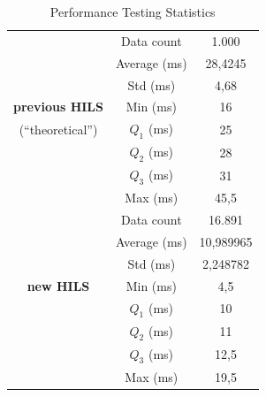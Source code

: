 \begin{table}[!htbp]
	\caption{Performance Testing Statistics}
	\label{tbl-section-5-perf-result-statistics}
	\begin{center}
		\begin{tabular}{c c c}
			\toprule
			                       & Data count   & 1.000     \\
			\cline{2-3}
			                       & Average (ms) & 28,4245   \\
			\cline{2-3}
			                       & Std (ms)     & 4,68      \\
			\cline{2-3}
			\textbf{previous HILS} & Min (ms)     & 16        \\
			\cline{2-3}
			(``theoretical'')      & $Q_1$ (ms)   & 25        \\
			\cline{2-3}
			                       & $Q_2$ (ms)   & 28        \\
			\cline{2-3}
			                       & $Q_3$ (ms)   & 31        \\
			\cline{2-3}
			                       & Max (ms)     & 45,5      \\
			\midrule
			                       & Data count   & 16.891    \\
			\cline{2-3}
			                       & Average (ms) & 10,989965 \\
			\cline{2-3}
			                       & Std (ms)     & 2,248782  \\
			\cline{2-3}
			\textbf{new HILS}      & Min (ms)     & 4,5       \\
			\cline{2-3}
			                       & $Q_1$ (ms)   & 10        \\
			\cline{2-3}
			                       & $Q_2$ (ms)   & 11        \\
			\cline{2-3}
			                       & $Q_3$ (ms)   & 12,5      \\
			\cline{2-3}
			                       & Max (ms)     & 19,5      \\
			\bottomrule
		\end{tabular}
	\end{center}
\end{table}

